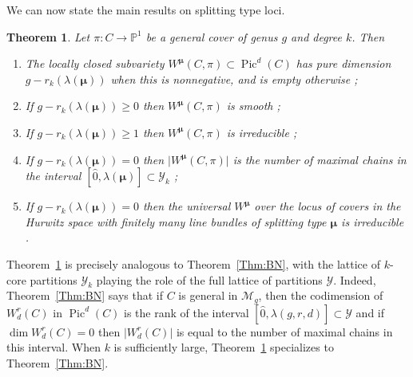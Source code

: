 \documentclass{amsart}
\newtheorem{theorem}{Theorem}[section]
\theoremstyle{definition}
\def\bmu{\bm{\mu}}
\newcommand{\PP}{\mathbb{P}}
\newcommand{\Pic}{\operatorname{Pic}}
\begin{document}
We can now state the main results on splitting type loci.

\begin{theorem} \label{Thm:HBN}
Let $\pi \colon C \to \PP^1$ be a general cover of genus $g$ and degree $k$.  Then
\begin{enumerate}
\item  The locally closed subvariety $W^{\bmu} (C,\pi) \subset \Pic^d (C)$ has pure dimension  $g - r_k (\lambda (\bmu))$ when this is nonnegative, and is empty otherwise \cite{Larson21, CPJ19}{\em ;}
\item If $g - r_k(\lambda(\bmu)) \geq 0$ then $W^{\bmu} (C,\pi)$ is smooth \cite{Larson21}{\em ;}
\item If $g - r_k(\lambda(\bmu)) \geq 1$ then $W^{\bmu} (C,\pi)$ is irreducible \cite{LLV}{\em ;}
\item If $g - r_k(\lambda(\bmu)) = 0$ then $\vert W^{\bmu} (C,\pi) \vert$ is the number of maximal chains in the interval $[\hat{0}, \lambda(\bmu)] \subset \mathcal{Y}_k$ \cite{LLV}{\em ;}
\item If $g - r_k(\lambda(\bmu)) = 0$ then the universal $W^{\bmu}$ over the locus of covers in the Hurwitz space with finitely many line bundles of splitting type $\bmu$ is irreducible \cite{LLV}.
\end{enumerate}
\end{theorem}

Theorem~\ref{Thm:HBN} is precisely analogous to Theorem~\ref{Thm:BN}, with the lattice of $k$-core partitions $\mathcal{Y}_k$ playing the role of the full lattice of partitions $\mathcal{Y}$.  Indeed, Theorem~\ref{Thm:BN} says that if $C$ is general in $\mathcal{M}_g$, then the codimension of $W^r_d (C)$ in $\Pic^d (C)$ is the rank of the interval $[\hat{0}, \lambda(g,r,d) ] \subset \mathcal{Y}$ and if $\dim W^r_d(C) = 0$ then $\vert W^r_d (C) \vert$ is equal to the number of maximal chains in this interval.  When $k$ is sufficiently large, Theorem~\ref{Thm:HBN} specializes to Theorem~\ref{Thm:BN}.  
\end{document}
